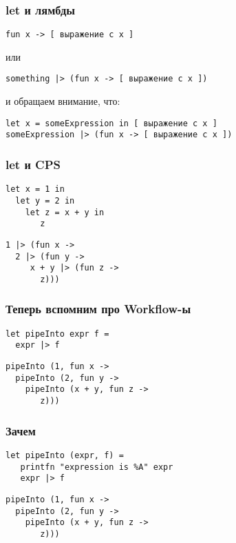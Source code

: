 \documentclass{../../slides-style}
\begin{document}
    \begin{frame}[fragile]
        \frametitle{let и лямбды}
        \begin{verbatim}
fun x -> [ выражение c x ]
        \end{verbatim}
        или
        \begin{verbatim}
something |> (fun x -> [ выражение c x ])
        \end{verbatim}
        и обращаем внимание, что:
        \begin{verbatim}
let x = someExpression in [ выражение c x ]
someExpression |> (fun x -> [ выражение c x ])
        \end{verbatim}
    \end{frame}

    \begin{frame}[fragile]
        \frametitle{let и CPS}
        \begin{verbatim}
let x = 1 in
  let y = 2 in
    let z = x + y in
       z
        \end{verbatim}
        \begin{verbatim}
1 |> (fun x ->
  2 |> (fun y -> 
     x + y |> (fun z -> 
       z)))
        \end{verbatim}
    \end{frame}

    \begin{frame}[fragile]
        \frametitle{Теперь вспомним про Workflow-ы}
        \begin{verbatim}
let pipeInto expr f =
  expr |> f
        \end{verbatim}
        \begin{verbatim}
pipeInto (1, fun x ->
  pipeInto (2, fun y -> 
    pipeInto (x + y, fun z -> 
       z)))
        \end{verbatim}
    \end{frame}

    \begin{frame}[fragile]
        \frametitle{Зачем}
        \begin{verbatim}
let pipeInto (expr, f) =
   printfn "expression is %A" expr 
   expr |> f 
        \end{verbatim}
        \begin{verbatim}
pipeInto (1, fun x ->
  pipeInto (2, fun y -> 
    pipeInto (x + y, fun z -> 
       z)))
        \end{verbatim}
    \end{frame}
\end{document}
